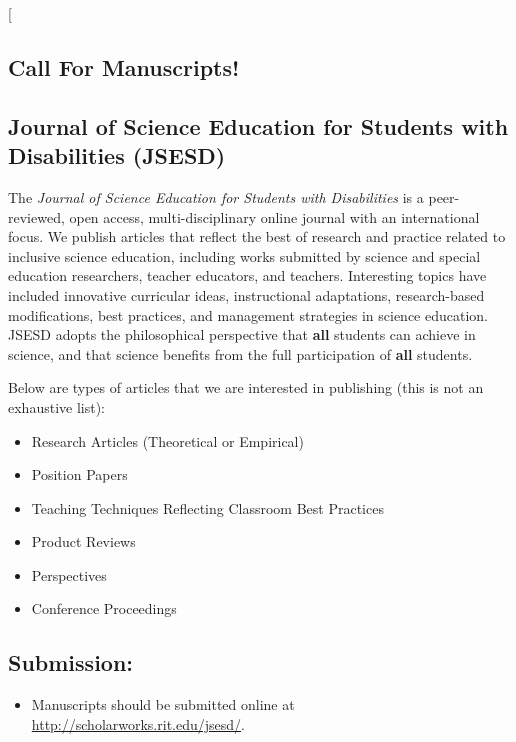 \documentclass[11pt]{sig-alternate}
\begin{document}
\begin{large}
\twocolumn[
\begin{@twocolumnfalse}

\section*{Call For Manuscripts!}

\subsection*{Journal of Science Education for Students with Disabilities (JSESD)}

The \textit{Journal of Science Education for Students with Disabilities} is a peer-reviewed, open access, multi-disciplinary online journal with an international focus. We publish articles that reflect the best of research and practice related to inclusive science education, including works submitted by science and special education researchers, teacher educators, and teachers. Interesting topics have included innovative curricular ideas, instructional adaptations, research-based modifications, best practices, and management strategies in science education. JSESD adopts the philosophical perspective that \textbf{all} students can achieve in science, and that science benefits from the full participation of \textbf{all} students.

Below are types of articles that we are interested in publishing (this is not an exhaustive list):

\begin{itemize}
    \item Research Articles (Theoretical or Empirical)
    \item Position Papers
    \item Teaching Techniques Reflecting Classroom Best Practices
    \item Product Reviews
    \item Perspectives
    \item Conference Proceedings
\end{itemize}

\subsection*{Submission:}
\begin{itemize}
    \item Manuscripts should be submitted online at \url{http://scholarworks.rit.edu/jsesd/}.
\end{itemize}


\end{@twocolumnfalse}
\end{large}
\end{document}
